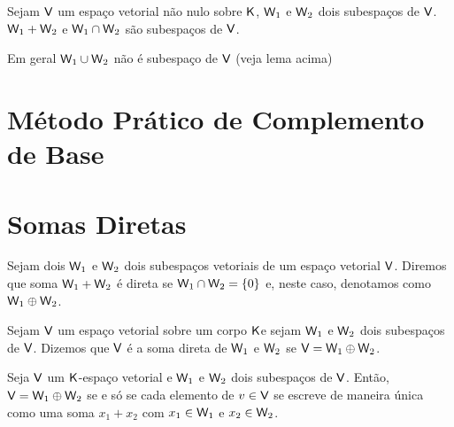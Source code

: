 \documentclass[10pt,a4paper]{book}
\begin{document}
\begin{lemma} 
	Sejam $\mathsf{ V }$ um espaço vetorial não nulo sobre $\mathsf{ K }$, $\mathsf{ W }_1$ e $\mathsf{ W }_2$ dois subespaços de $\mathsf{ V }$. $\mathsf{ W }_1 + \mathsf{ W }_2$ e $\mathsf{ W }_1 \cap \mathsf{ W }_2$ são subespaços de $\mathsf{ V }$.
\end{lemma}

\begin{attention} 
	Em geral $\mathsf{ W }_1 \cup \mathsf{ W }_2$ não é subespaço de $\mathsf{ V }$ (veja lema acima)
\end{attention}




\section{Método Prático de Complemento de Base}




\section{Somas Diretas}

\begin{definition}
	Sejam dois $\mathsf{ W }_1$ e $\mathsf{ W }_2$ dois subespaços vetoriais de um espaço vetorial $\mathsf{ V }$. Diremos que soma $\mathsf{ W }_1 + \mathsf{ W }_2$ é direta se $\mathsf{ W }_1 \cap \mathsf{ W }_2 = \{ 0 \}$ e, neste caso, denotamos como $\mathsf{ W }_1 \oplus \mathsf{ W }_2$.
\end{definition}

\begin{definition}
	Sejam $\mathsf{ V }$ um espaço vetorial sobre um corpo $\mathsf{ K }$e sejam $\mathsf{ W }_1$ e $\mathsf{ W }_2$ dois subespaços de $\mathsf{ V }$.
	Dizemos que $\mathsf{ V }$ é a soma direta de $\mathsf{ W }_1$ e $\mathsf{ W }_2$ se $\mathsf{ V } = \mathsf{ W }_1 \oplus \mathsf{ W }_2$.
\end{definition}

\begin{proposition}
	Seja $\mathsf{ V }$ um $\mathsf{ K }$-espaço vetorial e $\mathsf{ W }_1$ e $\mathsf{ W }_2$ dois subespaços de $\mathsf{ V }$. Então, $\mathsf{ V } = \mathsf{ W }_1 \oplus \mathsf{ W }_2$ se e só se cada elemento de $v \in \mathsf{ V }$ se escreve de maneira única como uma soma $x_1 + x_2$ com $x_1 \in \mathsf{ W }_1$ e $x_2 \in \mathsf{ W }_2$.
\end{proposition}
\end{document}
